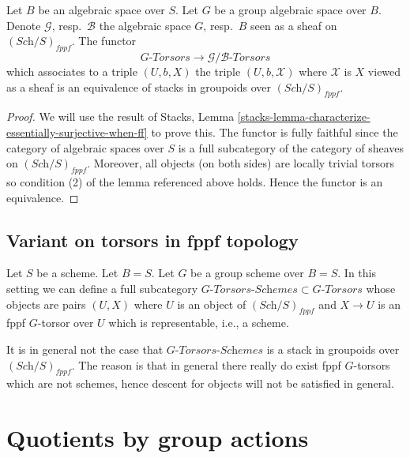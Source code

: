 \begin{lemma}
\label{lemma-compare-torsors}
Let $B$ be an algebraic space over $S$. Let $G$ be a group algebraic
space over $B$. Denote $\mathcal{G}$, resp.\ $\mathcal{B}$ the algebraic
space $G$, resp.\ $B$ seen as a sheaf on $(\textit{Sch}/S)_{fppf}$.
The functor
$$
G\textit{-Torsors} \longrightarrow \mathcal{G}/\mathcal{B}\textit{-Torsors}
$$
which associates to a triple $(U, b, X)$ the triple
$(U, b, \mathcal{X})$ where $\mathcal{X}$ is $X$ viewed as a sheaf
is an equivalence of stacks in groupoids over $(\textit{Sch}/S)_{fppf}$.
\end{lemma}

\begin{proof}
We will use the result of
Stacks, Lemma \ref{stacks-lemma-characterize-essentially-surjective-when-ff}
to prove this. The functor is fully faithful since the category of
algebraic spaces over $S$ is a full subcategory of the category of
sheaves on $(\textit{Sch}/S)_{fppf}$.
Moreover, all objects (on both sides) are locally trivial torsors
so condition (2) of the lemma referenced above holds.
Hence the functor is an equivalence.
\end{proof}



\subsection{Variant on torsors in fppf topology}
\label{subsection-variant-fppf-torsors}

\noindent
Let $S$ be a scheme. Let $B = S$.
Let $G$ be a group scheme over $B = S$.
In this setting we can define a full subcategory
$G\textit{-Torsors-Schemes} \subset G\textit{-Torsors}$
whose objects are pairs $(U, X)$ where $U$ is an object of
$(\textit{Sch}/S)_{fppf}$ and $X \to U$ is an fppf
$G$-torsor over $U$ which is representable, i.e., a scheme.

\medskip\noindent
It is in general not the case that $G\textit{-Torsors-Schemes}$ is
a stack in groupoids over $(\textit{Sch}/S)_{fppf}$. The reason is
that in general there really do exist fppf $G$-torsors
which are not schemes, hence descent for objects will not be satisfied
in general.






\section{Quotients by group actions}
\label{section-group-quotient-stacks}

